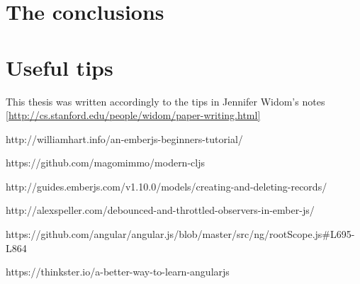\documentclass[inzynier,druk,ramka]{build/dyplom}
\begin{document}
\subsection{}

\chapter{The conclusions}

\chapter{Useful tips}

This thesis was written accordingly to the tips in Jennifer Widom's notes \ref {http://cs.stanford.edu/people/widom/paper-writing.html}

\cite{ember2014}

\nocite{*}


\begin{thebibliography}{9}

  http://williamhart.info/an-emberjs-beginners-tutorial/

https://github.com/magomimmo/modern-cljs

http://guides.emberjs.com/v1.10.0/models/creating-and-deleting-records/

http://alexspeller.com/debounced-and-throttled-observers-in-ember-js/

 https://github.com/angular/angular.js/blob/master/src/ng/rootScope.js\#L695-L864

 https://thinkster.io/a-better-way-to-learn-angularjs

\end{thebibliography}
\end{document}
